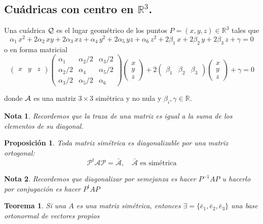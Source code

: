 \documentclass[11pt, a4paper]{article}
\newif\IfInSansMode
\theoremstyle{theorem-style}
\newtheorem{nth}{Teorema}[section]
\newtheorem{nprop}{Proposición}[section]
\theoremstyle{definition-style}
\theoremstyle{remark-style}
\newtheorem*{nota}{Nota}
\theoremstyle{example-style}
\begin{document}
\subsection{Cuádricas con centro en $\mathbb{R}^3$.}


Una cuádrica  $\cal Q$ es el lugar geométrico de los puntos $P=(x,y,z)\in\mathbb{R}^3$ tales que
\[ 
\alpha_1 \,x^2 + 2\alpha_2 \,x y + 2\alpha_3\,x z + \alpha_4 \,y^2 + 2 \alpha_5 \,y z + \alpha_6 \,z^2 
+ 2\beta_1 \,x+ 2\beta_2 \,y +2 \beta_3 \,z + \gamma = 0
\]
o en forma matricial 
\[  
\left( \begin{array}{ccc} 
x & y & z   
 \end{array} \right)\begin{pmatrix}
 \alpha_1 & \alpha_2 / 2 &\alpha_3 / 2\\
 \alpha_2 / 2 & \alpha_4 &\alpha_5 / 2\\
 \alpha_3 / 2& \alpha_5 / 2& \alpha_6
\end{pmatrix} 
\left(\begin{array}{c}
x \\
y \\
z
\end{array} \right)
+
 2\left( \begin{array}{ccc}
\beta_1 & \beta_2 & \beta_3   
 \end{array} \right)
\left( \begin{array}{c}
x \\
y \\
z
 \end{array} \right)
+ \gamma = 0
\]

donde $\cal A$ es una matriz $3\times 3$ simétrica y no nula y $\beta_i, \gamma\in\mathbb{R}$. 

\begin{nota}
	Recordemos que la traza de una matriz es igual a la suma de los elementos de su diagonal.
\end{nota}

\begin{nprop}
	Toda matriz simétrica es diagonalizable por una matriz ortogonal:
	\[
	\mathcal P ^t \mathcal A \mathcal P = \bar{ \mathcal A}, \quad \text{$\bar{\mathcal A}$ es simétrica}
	\]
\end{nprop}
\begin{nota}
	Recordemos que diagonalizar por semejanza es hacer $P^{-1}AP$ u hacerlo por conjugación es hacer $P^t A P$
\end{nota}

\begin{nth}
	Si una $A$ es una matriz simétrica, entonces $\exists = \{\bar e_1, \bar e_2, \bar e_3\}$ una base ortonormal de vectores propios
\end{nth}
\end{document}
